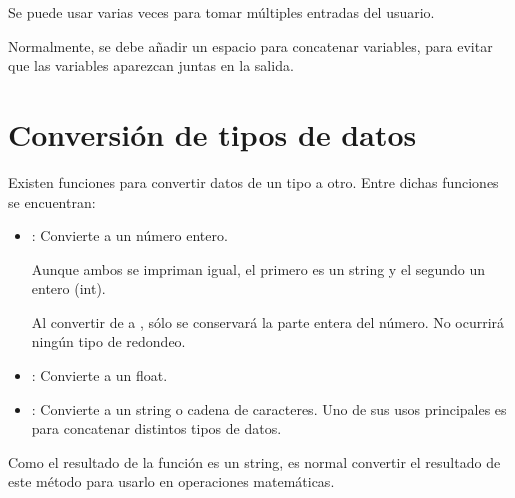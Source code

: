 Se puede usar  varias veces para tomar múltiples entradas del usuario.


Normalmente, se debe añadir un espacio para concatenar variables, para evitar que las variables aparezcan juntas en la salida.

\section{Conversión de tipos de datos}

Existen funciones para convertir datos de un tipo a otro.
Entre dichas funciones se encuentran:

\begin{itemize}
  \item {}: Convierte a un número entero.
  

  Aunque ambos se impriman igual, el primero es un string y el segundo un entero (int).


  Al convertir de  a , sólo se conservará la parte entera del número.
  No ocurrirá ningún tipo de redondeo.


  \item {}: Convierte a un float.
  

  \item {}: Convierte a un string o cadena de caracteres.
  Uno de sus usos principales es para concatenar distintos tipos de datos.


\end{itemize}

Como el resultado de la función  es un string, es normal convertir el resultado de este método para usarlo en operaciones matemáticas.

